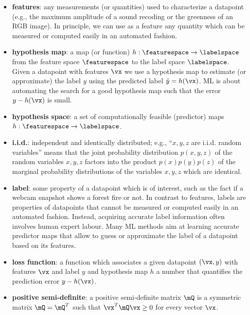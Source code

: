 \documentclass[12pt]{report}
\begin{document}
\begin{itemize}
\item {\bf features}: any measurements (or quantities) used to 
characterize a datapoint (e.g., the maximum amplitude of a 
sound recoding or the greenness of an RGB image). In principle, 
we can use as a feature any quantity which can be measured or 
computed easily in an automated fashion.  

\item {\bf hypothesis map}: a map (or function) $h: \featurespace \rightarrow \labelspace$ from the 
feature space $\featurespace$ to the label space $\labelspace$. 
Given a datapoint with features $\vx$ we use a hypothesis map 
to estimate (or approximate) the label $y$ using the predicted 
label $\hat{y} = h(\vx)$. ML is about automating the search for 
a good hypothesis map such that the error $y - h(\vx)$ is small. 

\item {\bf hypothesis space}: a set of computationally feasible 
(predictor) maps $h: \featurespace \rightarrow \labelspace$. 

\item {\bf i.i.d.}: independent and identically distributed; e.g., 
``$x,y,z$ are i.i.d. random variables'' means that the joint 
probability distribution $p(x,y,z)$ of the random variables 
$x,y,z$ factors into the product $p(x)p(y)p(z)$ of the marginal 
probability distributions of the variables $x,y,z$ which are 
identical.

\item {\bf label}: some property of a datapoint which is of interest, 
such as the fact if a webcam snapshot shows a forest fire or not. In 
contrast to features, labels are properties of datapoints that cannot 
be measured or computed easily in an automated fashion. Instead, 
acquiring accurate label information often involves human expert labour. 
Many ML methods aim at learning accurate predictor maps that allow 
to guess or approximate the label of a datapoint based on its features. 

\item {\bf loss function}: a function which associates a given datapoint $(\vx,y)$ with features $\vx$ 
and label $y$ and hypothesis map $h$ a number that quantifies the prediction error $y-h(\vx)$. 

\item {\bf positive semi-definite}: a positive semi-definite matrix $\mQ$ is 
a symmetric matrix $\mQ = \mQ^{T}$ such that $\vx^{T} \mQ \vx \geq 0$ 
for every vector $\vx$. 


\end{itemize}
\end{document}
